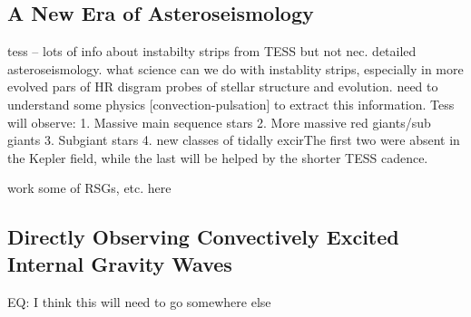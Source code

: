 {\color{blue}
\subsection{A New Era of Asteroseismology}

tess -- lots of info about instabilty strips from TESS but not nec. detailed asteroseismology.  what science can we do with instablity strips, especially in more evolved pars of HR disgram  probes of stellar structure and evolution.   need to understand some physics [convection-pulsation] to extract this information.   Tess will observe: 1. Massive main sequence stars 2. More massive red giants/sub giants 3. Subgiant stars 4.  new classes of tidally excirThe first two were absent in the Kepler field, while the last will be helped by the shorter TESS cadence.

work some of RSGs, etc. here

\subsection{Directly Observing Convectively Excited Internal Gravity Waves}

EQ: I think this will need to go somewhere else



}